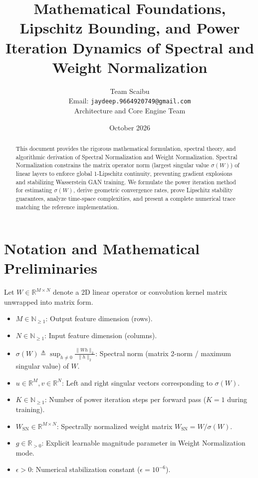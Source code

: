 \documentclass[11pt,a4paper]{article}
\title{\textbf{Mathematical Foundations, Lipschitz Bounding, and Power Iteration Dynamics of Spectral and Weight Normalization}}
\author{Team Scaibu \\ \small Email: \texttt{jaydeep.9664920749@gmail.com} \\ \small Architecture and Core Engine Team}
\date{October 2026}
\theoremstyle{definition}
\begin{document}
\maketitle

\begin{abstract}
This document provides the rigorous mathematical formulation, spectral theory, and algorithmic derivation of Spectral Normalization and Weight Normalization. Spectral Normalization constrains the matrix operator norm (largest singular value $\sigma(W)$) of linear layers to enforce global 1-Lipschitz continuity, preventing gradient explosions and stabilizing Wasserstein GAN training. We formulate the power iteration method for estimating $\sigma(W)$, derive geometric convergence rates, prove Lipschitz stability guarantees, analyze time-space complexities, and present a complete numerical trace matching the reference implementation.
\end{abstract}

\section{Notation and Mathematical Preliminaries}

Let $W \in \mathbb{R}^{M \times N}$ denote a 2D linear operator or convolution kernel matrix unwrapped into matrix form.

\begin{itemize}
    \item $M \in \mathbb{N}_{\ge 1}$: Output feature dimension (rows).
    \item $N \in \mathbb{N}_{\ge 1}$: Input feature dimension (columns).
    \item $\sigma(W) \triangleq \sup_{h \ne 0} \frac{\|W h\|_2}{\|h\|_2}$: Spectral norm (matrix 2-norm / maximum singular value) of $W$.
    \item $u \in \mathbb{R}^M, v \in \mathbb{R}^N$: Left and right singular vectors corresponding to $\sigma(W)$.
    \item $K \in \mathbb{N}_{\ge 1}$: Number of power iteration steps per forward pass ($K = 1$ during training).
    \item $W_{\text{SN}} \in \mathbb{R}^{M \times N}$: Spectrally normalized weight matrix $W_{\text{SN}} = W / \sigma(W)$.
    \item $g \in \mathbb{R}_{> 0}$: Explicit learnable magnitude parameter in Weight Normalization mode.
    \item $\epsilon > 0$: Numerical stabilization constant ($\epsilon = 10^{-6}$).
\end{itemize}
\end{document}
